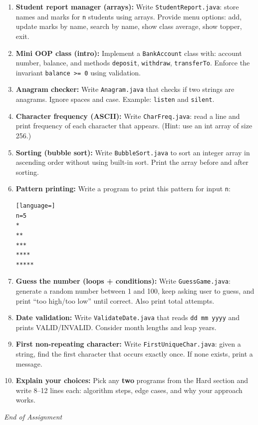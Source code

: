 \documentclass[11pt,a4paper]{article}
\begin{document}
\begin{enumerate}[label=H\arabic*., leftmargin=*]
  \item \textbf{Student report manager (arrays):} Write \texttt{StudentReport.java}:
    store names and marks for \texttt{n} students using arrays.
    Provide menu options: add, update marks by name, search by name, show class average, show topper, exit.

  \item \textbf{Mini OOP class (intro):} Implement a \texttt{BankAccount} class with:
    account number, balance, and methods \texttt{deposit}, \texttt{withdraw}, \texttt{transferTo}.
    Enforce the invariant \texttt{balance >= 0} using validation.

  \item \textbf{Anagram checker:} Write \texttt{Anagram.java} that checks if two strings are anagrams.
    Ignore spaces and case. Example: \texttt{listen} and \texttt{silent}.

  \item \textbf{Character frequency (ASCII):} Write \texttt{CharFreq.java}:
    read a line and print frequency of each character that appears. (Hint: use an int array of size 256.)

  \item \textbf{Sorting (bubble sort):} Write \texttt{BubbleSort.java} to sort an integer array in ascending order
    without using built-in sort. Print the array before and after sorting.

  \item \textbf{Pattern printing:} Write a program to print this pattern for input \texttt{n}:
    \begin{lstlisting}[language=]
n=5
*
**
***
****
*****
    \end{lstlisting}

  \item \textbf{Guess the number (loops + conditions):} Write \texttt{GuessGame.java}:
    generate a random number between 1 and 100, keep asking user to guess, and print ``too high/too low'' until correct.
    Also print total attempts.

  \item \textbf{Date validation:} Write \texttt{ValidateDate.java} that reads \texttt{dd mm yyyy} and prints VALID/INVALID.
    Consider month lengths and leap years.

  \item \textbf{First non-repeating character:} Write \texttt{FirstUniqueChar.java}:
    given a string, find the first character that occurs exactly once.
    If none exists, print a message.

  \item \textbf{Explain your choices:} Pick any \textbf{two} programs from the Hard section and write 8--12 lines each:
    algorithm steps, edge cases, and why your approach works.
\end{enumerate}

\vfill
\noindent\textit{End of Assignment}
\end{document}
